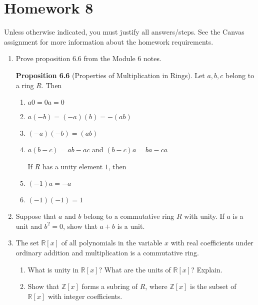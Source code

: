 \documentclass{article}
\newcommand{\ZZ}{\mathbb{Z}}
\newcommand{\RR}{\mathbb{R}}
\begin{document}
\section*{Homework 8}

Unless otherwise indicated, you must justify all answers/steps. See the Canvas assignment for more information about the homework requirements. 

\begin{enumerate}
    \item Prove proposition 6.6 from the Module 6 notes.
    
        \textbf{Proposition 6.6} (Properties of Multiplication in Rings). Let $a,b,c$ belong to a ring $R$. Then 
        \begin{multicols}{2}
            \begin{enumerate}
                \item $a0=0a=0$
                \item $a(-b)=(-a)(b)=-(ab)$
                \item $(-a)(-b)=(ab)$
                \item $a(b-c)=ab-ac$ and $(b-c)a=ba-ca$
                
            \columnbreak
                
            \hspace{-2em}If $R$ has a unity element $1$, then 
                \item $(-1)a=-a$
                \item $(-1)(-1)=1$
                \vspace*{2em}
            \end{enumerate}
        \end{multicols}

     \item Suppose that $a$ and $b$ belong to a commutative ring $R$ with unity. If $a$ is a unit and $b^2=0$, show that $a+b$ is a unit.
     

     \item The set $\RR[x]$ of all polynomials in the variable $x$ with real coefficients under ordinary addition and multiplication is a commutative ring.
     \begin{enumerate}
        \item What is unity in $\RR[x]$? What are the units of $\RR[x]$? Explain. 
        

        \item Show that $\ZZ[x]$ forms a subring of $R$, where $\ZZ[x]$ is the subset of $\RR[x]$ with integer coefficients. 
        


\end{enumerate}
\end{enumerate}
\end{document}
